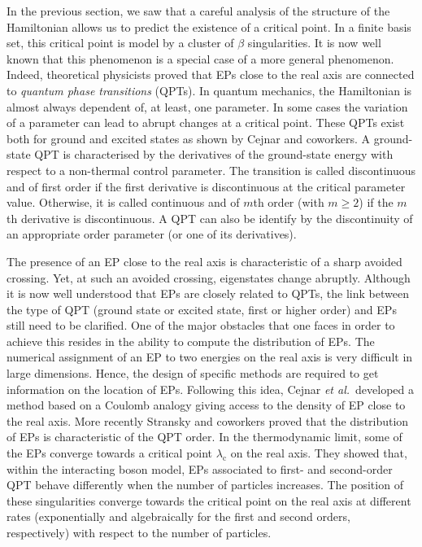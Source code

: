 \documentclass[aps,prb,reprint,noshowkeys,linenumbers,superscriptaddress]{revtex4-1}
\begin{document}
In the previous section, we saw that a careful analysis of the structure of the Hamiltonian allows us to predict the existence of a critical point. 
In a finite basis set, this critical point is model by a cluster of $\beta$ singularities. 
It is now well known that this phenomenon is a special case of a more general phenomenon. 
Indeed, theoretical physicists proved that EPs close to the real axis are connected to \textit{quantum phase transitions} (QPTs). \cite{Heiss_1988,Heiss_2002,Borisov_2015,Sindelka_2017,CarrBook,Vojta_2003,SachdevBook,GilmoreBook} 
In quantum mechanics, the Hamiltonian is almost always dependent of, at least, one parameter. 
In some cases the variation of a parameter can lead to abrupt changes at a critical point. 
These QPTs exist both for ground and excited states as shown by Cejnar and coworkers. \cite{Cejnar_2005,Cejnar_2007,Caprio_2008,Cejnar_2009,Sachdev_2011,Cejnar_2015,Cejnar_2016, Macek_2019,Cejnar_2020} 
A ground-state QPT is characterised by the derivatives of the ground-state energy with respect to a non-thermal control parameter. \cite{Cejnar_2009, Sachdev_2011} 
The transition is called discontinuous and of first order if the first derivative is discontinuous at the critical parameter value. 
Otherwise, it is called continuous and of $m$th order (with $m \ge 2$) if the $m$th derivative is discontinuous. 
A QPT can also be identify by the discontinuity of an appropriate order parameter (or one of its derivatives). 

The presence of an EP close to the real axis is characteristic of a sharp avoided crossing. 
Yet, at such an avoided crossing, eigenstates change abruptly. 
Although it is now well understood that EPs are closely related to QPTs, the link between the type of QPT (ground state or excited state, first or higher order) and EPs still need to be clarified. 
One of the major obstacles that one faces in order to achieve this resides in the ability to compute the distribution of EPs. 
The numerical assignment of an EP to two energies on the real axis is very difficult in large dimensions. 
Hence, the design of specific methods are required to get information on the location of EPs. 
Following this idea, Cejnar \textit{et al.}~developed a method based on a Coulomb analogy giving access to the density of EP close to the real axis. \cite{Cejnar_2005, Cejnar_2007} 
More recently Stransky and coworkers proved that the distribution of EPs is characteristic of the QPT order. \cite{Stransky_2018} 
In the thermodynamic limit, some of the EPs converge towards a critical point $\lambda_\text{c}$ on the real axis. 
They showed that, within the interacting boson model, \cite{Lipkin_1965} EPs associated to first- and second-order QPT behave differently when the number of particles increases. 
The position of these singularities converge towards the critical point on the real axis at different rates (exponentially and algebraically for the first and second orders, respectively) with respect to the number of particles.
\end{document}
